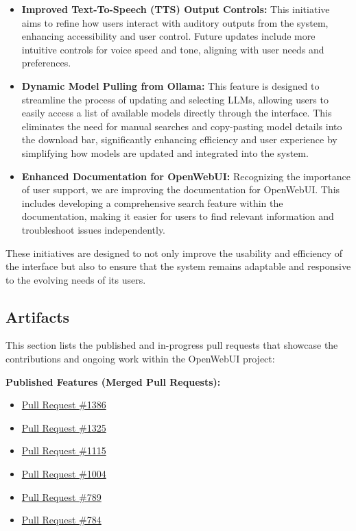 \documentclass[sigconf, nonacm]{acmart}
\begin{document}
\begin{itemize}
    \item \textbf{Improved Text-To-Speech (TTS) Output Controls:} This initiative aims to refine how users interact with auditory outputs from the system, enhancing accessibility and user control. Future updates include more intuitive controls for voice speed and tone, aligning with user needs and preferences.
       \item \textbf{Dynamic Model Pulling from Ollama:} This feature is designed to streamline the process of updating and selecting LLMs, allowing users to easily access a list of available models directly through the interface. This eliminates the need for manual searches and copy-pasting model details into the download bar, significantly enhancing efficiency and user experience by simplifying how models are updated and integrated into the system.
    \item \textbf{Enhanced Documentation for OpenWebUI:} Recognizing the importance of user support, we are improving the documentation for OpenWebUI. This includes developing a comprehensive search feature within the documentation, making it easier for users to find relevant information and troubleshoot issues independently.
\end{itemize}

These initiatives are designed to not only improve the usability and efficiency of the interface but also to ensure that the system remains adaptable and responsive to the evolving needs of its users.

\subsection{Artifacts}
This section lists the published and in-progress pull requests that showcase the contributions and ongoing work within the OpenWebUI project:

\textbf{Published Features (Merged Pull Requests):}
\begin{itemize}
    \item \href{https://github.com/open-webui/open-webui/pull/1386}{Pull Request \#1386}
    \item \href{https://github.com/open-webui/open-webui/pull/1325}{Pull Request \#1325}
    \item \href{https://github.com/open-webui/open-webui/pull/1115}{Pull Request \#1115}
    \item \href{https://github.com/open-webui/open-webui/pull/1004}{Pull Request \#1004}
    \item \href{https://github.com/open-webui/open-webui/pull/789}{Pull Request \#789}
    \item \href{https://github.com/open-webui/open-webui/pull/784}{Pull Request \#784}
\end{itemize}
\end{document}
